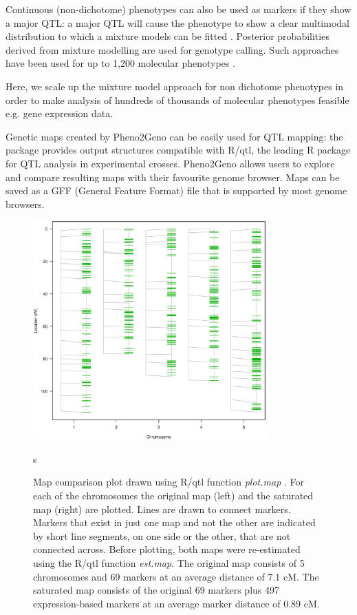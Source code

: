 Continuous (non-dichotome) phenotypes can also be used as markers if they show a major QTL: a 
major QTL will cause the phenotype to show a clear multimodal distribution to which a mixture 
models can be fitted \cite{Jansen:1993, Jansen:2001a}. Posterior probabilities derived from 
mixture modelling are used for genotype calling. Such approaches have been used for up to 
1,200 molecular phenotypes \cite{Gort:2010}.

Here, we scale up the mixture model approach for non dichotome phenotypes in order to make 
analysis of hundreds of thousands of molecular phenotypes feasible e.g. gene expression data.

Genetic maps created by Pheno2Geno can be easily used for QTL mapping: the package provides 
output structures compatible with R/qtl, the leading R package for QTL analysis in 
experimental crosses\cite{Broman:2003, Arends:2010}. Pheno2Geno allows users to 
explore and compare resulting maps with their favourite genome browser. Maps can be saved
as a GFF (General Feature Format) file that is supported by most genome browsers.

\begin{figure}[h!]
  \centering
  \includegraphics[keepaspectratio,width=0.8\textwidth]{eps/image_2_1.eps}
  \caption[Map comparison]{Map comparison plot drawn using R/qtl function \emph{plot.map} \cite{Broman:2003, Arends:2010}. For 
          each of the chromosomes the original map (left) and the saturated map (right) are plotted. Lines are drawn
          to connect markers.  Markers that exist in just one map and not the other are indicated by short line 
          segments, on one side or the other, that are not connected across. Before plotting, both maps were 
          re-estimated using the R/qtl function \emph{est.map}. The original map consists of 5 chromosomes and 69 
          markers at an average distance of 7.1 cM. The saturated map consists of the original 69 markers plus 497 
          expression-based markers at an average marker distance of 0.89 cM.}
          s\label{fig:mapcomparison}
\end{figure}

